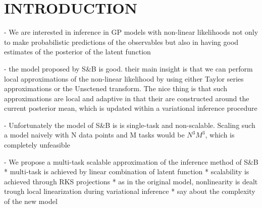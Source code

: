\section{INTRODUCTION}
% 
\citet{steinberg-bonilla-nips-2014}


- We are interested in inference in GP models with non-linear likelihoods
not only to make probabilistic predictions of the observables but also in having
good estimates of the posterior of the latent function

- the model proposed by S\&B \citep{steinberg-bonilla-nips-2014}
  is good. their main insight is that we can perform 
local approximations of the non-linear likelihood by using either Taylor series 
approximations  or the Unsctened transform. The nice thing is that such approximations
are local and adaptive in that their are constructed around the current posterior 
mean, which is updated within a variational inference procedure 

- Unfortunately the model of S\&B is  is single-task and non-scalable. 
Scaling such a model naively with N data points and M tasks would be $N^3M^3$,
which is completely unfeasible

- We propose a multi-task scalable approximation of  the inference method of S\&B 
* multi-task is achieved by linear combination of latent function
* scalability is achieved through RKS  projections 
* as in the original model, nonlinearity is dealt trough local linearization during 
variational inference
* say about the complexity of the new model 




